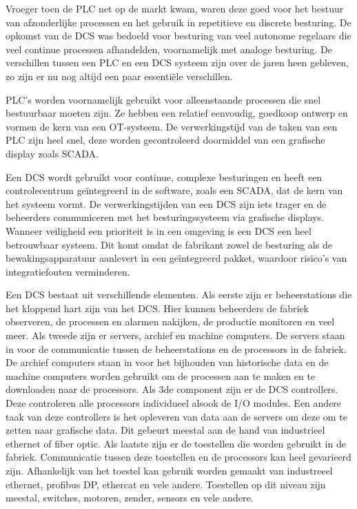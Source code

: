 Vroeger toen de PLC net op de markt kwam, waren deze goed voor het bestuur van afzonderlijke processen en het gebruik in repetitieve en discrete besturing. De opkomst van de DCS was bedoeld voor besturing van veel autonome regelaars die veel continue processen afhandelden, voornamelijk met analoge besturing. De verschillen tussen een PLC en een DCS systeem zijn over de jaren heen gebleven, zo zijn er nu nog altijd een paar essentiële verschillen.~\autocite{Realpars2019} 

PLC's worden voornamelijk gebruikt voor alleenstaande processen die snel bestuurbaar moeten zijn. Ze hebben een relatief eenvoudig, goedkoop ontwerp en vormen de kern van een OT-systeem. De verwerkingstijd van de taken van een PLC zijn heel snel, deze worden gecontroleerd doormiddel van een grafische display zoals SCADA.~\autocite{Realpars2019} 

Een DCS wordt gebruikt voor continue, complexe besturingen en heeft een controlecentrum geïntegreerd in de software, zoals een SCADA, dat de kern van het systeem vormt. De verwerkingstijden van een DCS zijn iets trager en de beheerders communiceren met het besturingssysteem via grafische displays. Wanneer veiligheid een prioriteit is in een omgeving is een DCS een heel betrouwbaar systeem. Dit komt omdat de fabrikant zowel de besturing als de bewakingsapparatuur aanlevert in een geïntegreerd pakket, waardoor risico's van integratiefouten verminderen.~\autocite{Realpars2019}  

Een DCS bestaat uit verschillende elementen. Als eerste zijn er beheerstations die het kloppend hart zijn van het DCS. Hier kunnen beheerders de fabriek observeren, de processen en alarmen nakijken, de productie monitoren en veel meer. Als tweede zijn er servers, archief en machine computers. De servers staan in voor de communicatie tussen de beheerstations en de processors in de fabriek. De archief computers staan in voor het bijhouden van historische data en de machine computers worden gebruikt om de processen aan te maken en te downloaden naar de processors. Als 3de component zijn er de DCS controllers. Deze controleren alle processors individueel alsook de I/O modules. Een andere taak van deze controllers is het opleveren van data aan de servers om deze om te zetten naar grafische data. Dit gebeurt meestal aan de hand van industrieel ethernet of fiber optic. Als laatste zijn er de toestellen die worden gebruikt in de fabriek. Communicatie tussen deze toestellen en de processors kan heel gevarieerd zijn. Afhankelijk van het toestel kan gebruik worden gemaakt van industreeel ethernet, profibus DP, ethercat en vele andere. Toestellen op dit niveau zijn meestal, switches, motoren, zender, sensors en vele andere.~\autocite{Realpars2019} 

